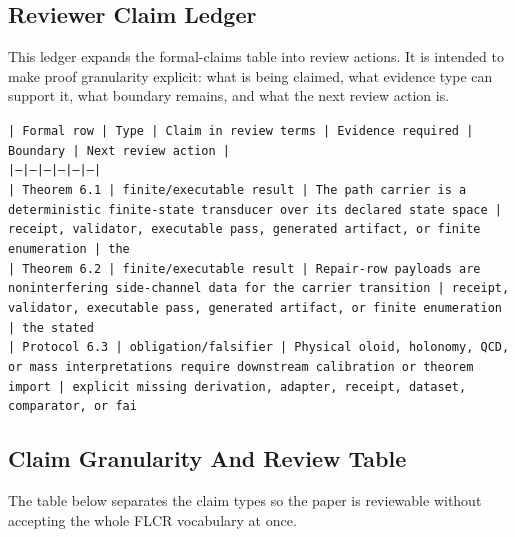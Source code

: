\documentclass[11pt]{article}
\begin{document}
\subsection*{Reviewer Claim Ledger}

This ledger expands the formal-claims table into review actions. It is intended to make proof granularity explicit: what is being claimed, what evidence type can support it, what boundary remains, and what the next review action is.

\noindent\texttt{| Formal row | Type | Claim in review terms | Evidence required | Boundary | Next review action |}\\
\noindent\texttt{|---|---|---|---|---|---|}\\
\noindent\texttt{| Theorem 6.1 | finite/executable result | The path carrier is a deterministic finite-state transducer over its declared state space | receipt, validator, executable pass, generated artifact, or finite enumeration | the }\\
\noindent\texttt{| Theorem 6.2 | finite/executable result | Repair-row payloads are noninterfering side-channel data for the carrier transition | receipt, validator, executable pass, generated artifact, or finite enumeration | the stated}\\
\noindent\texttt{| Protocol 6.3 | obligation/falsifier | Physical oloid, holonomy, QCD, or mass interpretations require downstream calibration or theorem import | explicit missing derivation, adapter, receipt, dataset, comparator, or fai}\\

\subsection*{Claim Granularity And Review Table}

The table below separates the claim types so the paper is reviewable without accepting the whole FLCR vocabulary at once.
\end{document}
